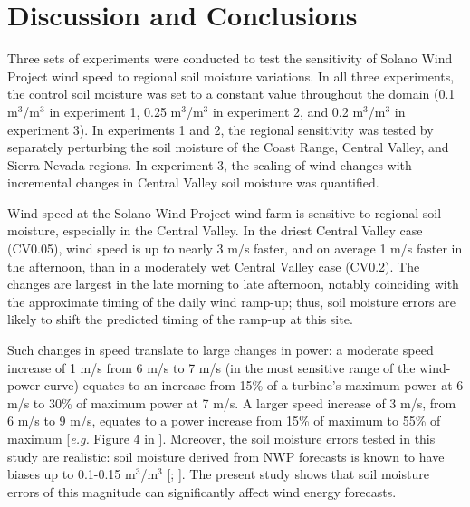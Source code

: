 
\section{Discussion and Conclusions}
\label{sec:solano_disc}

Three sets of experiments were conducted to test the sensitivity of Solano Wind Project wind speed to regional soil moisture variations.  In all three experiments, the control soil moisture was set to a constant value throughout the domain (0.1 m$^3$/m$^3$ in experiment 1, 0.25 m$^3$/m$^3$ in experiment 2, and 0.2 m$^3$/m$^3$ in experiment 3).  In experiments 1 and 2, the regional sensitivity was tested by separately perturbing the soil moisture of the Coast Range, Central Valley, and Sierra Nevada regions.  In experiment 3, the scaling of wind changes with incremental changes in Central Valley soil moisture was quantified.

Wind speed at the Solano Wind Project wind farm is sensitive to regional soil moisture, especially in the Central Valley.  In the driest Central Valley case (CV0.05), wind speed is up to nearly 3 m/s faster, and on average 1 m/s faster in the afternoon, than in a moderately wet Central Valley case (CV0.2).  The changes are largest in the late morning to late afternoon, notably coinciding with the approximate timing of the daily wind ramp-up; thus, soil moisture errors are likely to shift the predicted timing of the ramp-up at this site.  

Such changes in speed translate to large changes in power: a moderate speed increase of 1 m/s from 6 m/s to 7 m/s (in the most sensitive range of the wind-power curve) equates to an increase from 15\% of a turbine's maximum power at 6 m/s to 30\% of maximum power at 7 m/s. A larger speed increase of 3 m/s, from 6 m/s to 9 m/s, equates to a power increase from 15\% of maximum to 55\% of maximum [\textit{e.g.} Figure 4 in \cite{wharton2012atmospheric}].  Moreover, the soil moisture errors tested in this study are realistic: soil moisture derived from NWP forecasts is known to have biases up to 0.1-0.15 m$^3$/m$^3$ [\cite{marshall2003impact}; \cite{godfrey2008soil}].  The present study shows that soil moisture errors of this magnitude can significantly affect wind energy forecasts.

